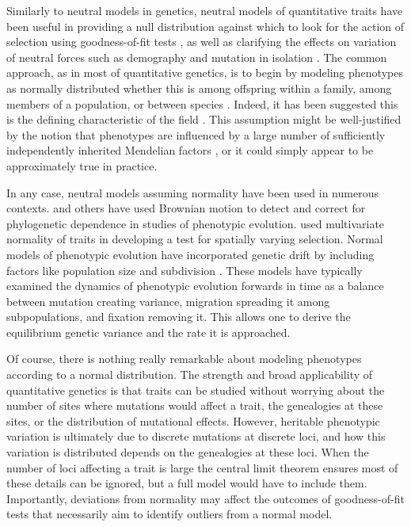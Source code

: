 Similarly to neutral models in genetics, neutral models of quantitative traits
have been useful in providing a null distribution against which to look for the
action of selection using goodness-of-fit tests \citep{Lande1976}, as well as
clarifying the effects on variation of neutral forces such as demography and
mutation in isolation \citet{Lynch1986}. The common approach, as in most of
quantitative genetics, is to begin by modeling phenotypes as normally
distributed whether this is among offspring within a family, among members of a
population, or between species \citep{Turelli2017}. Indeed, it has been
suggested this is the defining characteristic of the field \citep{Rice2004}.
This assumption might be well-justified by the notion that phenotypes are
influenced by a large number of sufficiently independently inherited Mendelian
factors \citep{Fisher1918}, or it could simply appear to be approximately true
in practice.


In any case, neutral models assuming normality have been used in numerous
contexts. \citet{Freckleton2002} and others have used Brownian motion to detect
and correct for phylogenetic dependence in studies of phenotypic
evolution. \citet{Ovaskainen2011} used multivariate normality of traits in
developing a test for spatially varying selection. Normal models of phenotypic
evolution have incorporated genetic drift by including factors like population
size and subdivision \citep{Chakraborty1982,Lynch1986,Lande1992}. These models
have typically examined the dynamics of phenotypic evolution forwards in time as
a balance between mutation creating variance, migration spreading it among
subpopulations, and fixation removing it. This allows one to derive the
equilibrium genetic variance and the rate it is approached.

Of course, there is nothing really remarkable about modeling phenotypes
according to a normal distribution. The strength and broad applicability of
quantitative genetics is that traits can be studied without worrying about the
number of sites where mutations would affect a trait, the genealogies at these
sites, or the distribution of mutational effects. However, heritable phenotypic
variation is ultimately due to discrete mutations at discrete loci, and how this
variation is distributed depends on the genealogies at these loci. When the
number of loci affecting a trait is large the central limit theorem ensures most
of these details can be ignored, but a full model would have to include them.
Importantly, deviations from normality may affect the outcomes of
goodness-of-fit tests that necessarily aim to identify outliers from a normal
model.


